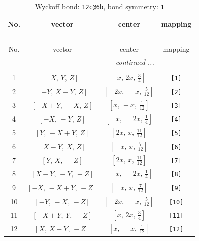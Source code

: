 \documentclass[fleqn,8pt]{jsarticle}
\begin{document}
\begin{longtable}{cccc}
\caption{Wyckoff bond: {\tt 12c@6b}, bond symmetry: {\tt 1}}
 \\
 \hline \hline
No. & vector & center & mapping \\ \hline \endfirsthead

\multicolumn{3}{l}{\tablename\ \thetable{}} \\
 \hline \hline
No. & vector & center & mapping \\ \hline \endhead

 \hline \hline
\multicolumn{3}{r}{\footnotesize\it continued ...} \\ \endfoot

 \hline \hline
\multicolumn{3}{r}{} \\ \endlastfoot

1 & $\left[ X,\, Y,\, Z \right]$ & $\left[ x,\, 2 x,\, \frac{3}{4} \right]$ & {\tt [1]} \\ \hline
2 & $\left[ - Y,\, X - Y,\, Z \right]$ & $\left[ - 2 x,\, - x,\, \frac{5}{12} \right]$ & {\tt [2]} \\ \hline
3 & $\left[ - X + Y,\, - X,\, Z \right]$ & $\left[ x,\, - x,\, \frac{1}{12} \right]$ & {\tt [3]} \\ \hline
4 & $\left[ - X,\, - Y,\, Z \right]$ & $\left[ - x,\, - 2 x,\, \frac{1}{4} \right]$ & {\tt [4]} \\ \hline
5 & $\left[ Y,\, - X + Y,\, Z \right]$ & $\left[ 2 x,\, x,\, \frac{11}{12} \right]$ & {\tt [5]} \\ \hline
6 & $\left[ X - Y,\, X,\, Z \right]$ & $\left[ - x,\, x,\, \frac{7}{12} \right]$ & {\tt [6]} \\ \hline
7 & $\left[ Y,\, X,\, - Z \right]$ & $\left[ 2 x,\, x,\, \frac{11}{12} \right]$ & {\tt [7]} \\ \hline
8 & $\left[ X - Y,\, - Y,\, - Z \right]$ & $\left[ - x,\, - 2 x,\, \frac{1}{4} \right]$ & {\tt [8]} \\ \hline
9 & $\left[ - X,\, - X + Y,\, - Z \right]$ & $\left[ - x,\, x,\, \frac{7}{12} \right]$ & {\tt [9]} \\ \hline
10 & $\left[ - Y,\, - X,\, - Z \right]$ & $\left[ - 2 x,\, - x,\, \frac{5}{12} \right]$ & {\tt [10]} \\ \hline
11 & $\left[ - X + Y,\, Y,\, - Z \right]$ & $\left[ x,\, 2 x,\, \frac{3}{4} \right]$ & {\tt [11]} \\ \hline
12 & $\left[ X,\, X - Y,\, - Z \right]$ & $\left[ x,\, - x,\, \frac{1}{12} \right]$ & {\tt [12]} \\
\end{longtable}
\end{document}
